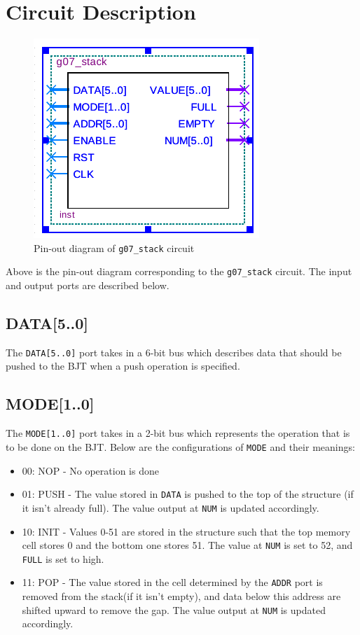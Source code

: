 \documentclass[12pt]{report}
\begin{document}
\chapter*{Circuit Description}
\begin{figure}[h]
	\begin{center}
		\caption{Pin-out diagram of \texttt{g07\_stack} circuit}
		\includegraphics[scale=0.9]{Lab3/stack_symb}
	\end{center}
\end{figure}
Above is the pin-out diagram corresponding to the \texttt{g07\_stack} circuit. The input and output
ports are described below.
\section*{DATA[5..0]}
The \texttt{DATA[5..0]} port takes in a 6-bit bus which describes data that should be pushed to the
BJT when a push operation is specified.
\section*{MODE[1..0]}
The \texttt{MODE[1..0]} port takes in a 2-bit bus which represents the operation that is to be done
on the BJT. Below are the configurations of \texttt{MODE} and their meanings:
\begin{itemize}
	\item 00: NOP - No operation is done
	\item 01: PUSH - The value stored in \texttt{DATA} is pushed to the top of the structure (if it
		isn't already full). The
		value output at \texttt{NUM} is updated accordingly.
	\item 10: INIT - Values 0-51 are stored in the structure such that the top memory cell stores 0
		and the bottom one stores 51. The value at \texttt{NUM} is set to 52, and \texttt{FULL} is
		set to high.
	\item 11: POP - The value stored in the cell determined by the \texttt{ADDR} port is removed
		from the stack(if it isn't empty), and data below this address are shifted upward to remove
		the gap. The value output at \texttt{NUM} is updated accordingly.
\end{itemize}
\end{document}
